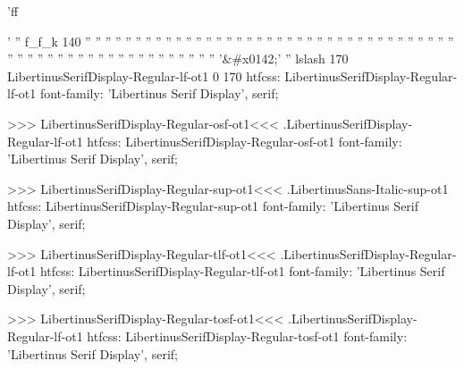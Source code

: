 'ff{' '' f_f_k 140
'' ''  
'' ''  
'' ''  
'' ''  
'' ''  
'' ''  
'' ''  
'' ''  
'' ''  
'' ''  
'' ''  
'' ''  
'' ''  
'' ''  
'' ''  
'' ''  
'' ''  
'' ''  
'' ''  
'' ''  
'' ''  
'' ''  
'' ''  
'' ''  
'' ''  
'' ''  
'' ''  
'' ''  
'' ''  
'&#x0142;' '' lslash 170
LibertinusSerifDisplay-Regular-lf-ot1 0 170
htfcss:  LibertinusSerifDisplay-Regular-lf-ot1  font-family: 'Libertinus Serif Display', serif;

>>>
\<LibertinusSerifDisplay-Regular-osf-ot1\><<<
.LibertinusSerifDisplay-Regular-lf-ot1
htfcss:  LibertinusSerifDisplay-Regular-osf-ot1  font-family: 'Libertinus Serif Display', serif;

>>>
\<LibertinusSerifDisplay-Regular-sup-ot1\><<<
.LibertinusSans-Italic-sup-ot1
htfcss:  LibertinusSerifDisplay-Regular-sup-ot1  font-family: 'Libertinus Serif Display', serif;

>>>
\<LibertinusSerifDisplay-Regular-tlf-ot1\><<<
.LibertinusSerifDisplay-Regular-lf-ot1
htfcss:  LibertinusSerifDisplay-Regular-tlf-ot1  font-family: 'Libertinus Serif Display', serif;

>>>
\<LibertinusSerifDisplay-Regular-tosf-ot1\><<<
.LibertinusSerifDisplay-Regular-lf-ot1
htfcss:  LibertinusSerifDisplay-Regular-tosf-ot1  font-family: 'Libertinus Serif Display', serif;

}

